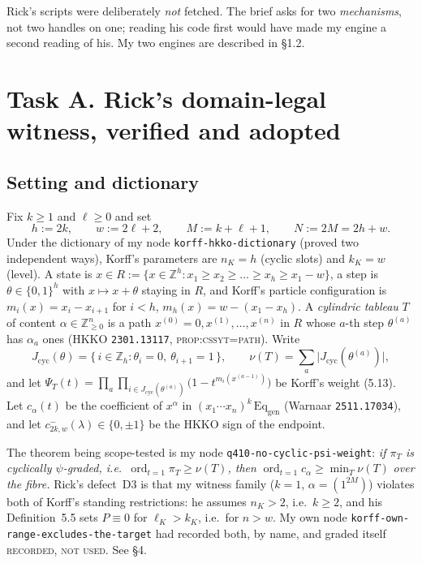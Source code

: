 \documentclass[11pt]{article}
\theoremstyle{definition}
\DeclareMathOperator{\ord}{ord}
\newcommand{\Z}{\mathbb{Z}}
\begin{document}
\noindent
Rick's scripts were deliberately \emph{not} fetched.  The brief asks for two
\emph{mechanisms}, not two handles on one; reading his code first would have made my
engine a second reading of his.  My two engines are described in \S1.2.

\section{Task A.  Rick's domain-legal witness, verified and adopted}

\subsection{Setting and dictionary}

Fix $k\ge 1$ and $\ell\ge 0$ and set
\[
  h:=2k,\qquad w:=2\ell+2,\qquad M:=k+\ell+1,\qquad N:=2M=2h+w .
\]
Under the dictionary of my node \texttt{korff-hkko-dictionary} (proved two independent
ways), Korff's parameters are $n_K=h$ (cyclic slots) and $k_K=w$ (level).  A state is
$x\in R:=\{x\in\Z^h : x_1\ge x_2\ge\dots\ge x_h\ge x_1-w\}$, a step is
$\theta\in\{0,1\}^h$ with $x\mapsto x+\theta$ staying in $R$, and Korff's particle
configuration is $m_i(x)=x_i-x_{i+1}$ for $i<h$, $m_h(x)=w-(x_1-x_h)$.
A \emph{cylindric tableau} $T$ of content $\alpha\in\Z_{\ge0}^n$ is a path
$x^{(0)}=0,x^{(1)},\dots,x^{(n)}$ in $R$ whose $a$-th step $\theta^{(a)}$ has
$\alpha_a$ ones (HKKO \texttt{2301.13117}, \textsc{prop:cssyt=path}).  Write
\[
  J_{\mathrm{cyc}}(\theta)=\{\,i\in\Z_h : \theta_i=0,\ \theta_{i+1}=1\,\},\qquad
  \nu(T)=\sum_{a}\bigl|J_{\mathrm{cyc}}(\theta^{(a)})\bigr| ,
\]
and let $\Psi_T(t)=\prod_a\prod_{i\in J_{\mathrm{cyc}}(\theta^{(a)})}
\bigl(1-t^{m_i(x^{(a-1)})}\bigr)$ be Korff's weight (5.13).
Let $c_\alpha(t)$ be the coefficient of $x^\alpha$ in
$(x_1\cdots x_n)^k\,\mathrm{Eq}_{\text{gen}}$ (Warnaar \texttt{2511.17034}), and let
$c^-_{2k,w}(\lambda)\in\{0,\pm1\}$ be the HKKO sign of the endpoint.

The theorem being scope-tested is my node \texttt{q410-no-cyclic-psi-weight}:
\emph{if $\pi_T$ is cyclically $\psi$-graded, i.e.\ $\ord_{t=1}\pi_T\ge\nu(T)$, then}
$\ord_{t=1}c_\alpha\ge\min_T\nu(T)$ \emph{over the fibre.}
Rick's defect~D3 is that my witness family ($k=1$, $\alpha=(1^{2M})$) violates both of
Korff's standing restrictions: he assumes $n_K>2$, i.e.\ $k\ge2$, and his Definition~5.5
sets $P\equiv0$ for $\ell_K>k_K$, i.e.\ for $n>w$.  My own node
\texttt{korff-own-range-excludes-the-target} had recorded both, by name, and graded
itself \textsc{recorded, not used}.  See \S4.
\end{document}
